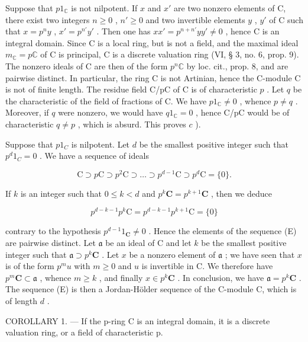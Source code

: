 Suppose that \(p1_{\mathbb{C}}\) is not nilpotent. If \(x\) and \(x'\) are two nonzero elements of C, there exist two integers \(n \geqslant 0\) , \(n' \geqslant 0\) and two invertible elements \(y\) , \(y'\) of C such that \(x = p^n y\) , \(x' = p^{n'} y'\) . Then one has \(xx' = p^{n+n'} yy' \neq 0\) , hence C is an integral domain. Since C is a local ring, but is not a field, and the maximal ideal \(m_{\mathbb{C}} = p\mathbb{C}\) of C is principal, C is a discrete valuation ring (VI, § 3, no. 6, prop. 9). The nonzero ideals of C are then of the form \(p^n\mathbb{C}\) by loc. cit., prop. 8, and are pairwise distinct. In particular, the ring C is not Artinian, hence the C-module C is not of finite length. The residue field C/pC of C is of characteristic \(p\) . Let \(q\) be the characteristic of the field of fractions of C. We have \(p1_{\mathbb{C}} \neq 0\) , whence \(p \neq q\) . Moreover, if \(q\) were nonzero, we would have \(q1_{\mathbb{C}} = 0\) , hence C/pC would be of characteristic \(q \neq p\) , which is absurd. This proves \(c\) ).

Suppose that \(p1_{C}\) is nilpotent. Let \(d\) be the smallest positive integer such that \(p^{d}1_{C} = 0\) . We have a sequence of ideals

\[
\mathrm{C} \supset p \mathrm{C} \supset p ^ {2} \mathrm{C} \supset \dots \supset p ^ {d - 1} \mathrm{C} \supset p ^ {d} \mathrm{C} = \{0 \}.\tag{E}
\]

If \(k\) is an integer such that \(0 \leqslant k < d\) and \(p^k\mathbf{C} = p^{k+1}\mathbf{C}\) , then we deduce

\[
p ^ {d - k - 1} p ^ {k} \mathrm{C} = p ^ {d - k - 1} p ^ {k + 1} \mathrm{C} = \{0 \}
\]

contrary to the hypothesis \(p^{d-1}1_{\mathbf{C}} \neq 0\) . Hence the elements of the sequence (E) are pairwise distinct. Let \(\mathfrak{a}\) be an ideal of C and let \(k\) be the smallest positive integer such that \(\mathfrak{a} \supset p^k\mathbf{C}\) . Let \(x\) be a nonzero element of \(\mathfrak{a}\) ; we have seen that \(x\) is of the form \(p^m u\) with \(m \geqslant 0\) and \(u\) is invertible in C. We therefore have \(p^m\mathbf{C} \subset \mathfrak{a}\) , whence \(m \geqslant k\) , and finally \(x \in p^k\mathbf{C}\) . In conclusion, we have \(\mathfrak{a} = p^k\mathbf{C}\) . The sequence (E) is then a Jordan-Hölder sequence of the C-module C, which is of length \(d\) .

COROLLARY 1. --- If the p-ring C is an integral domain, it is a discrete valuation ring, or a field of characteristic p.

